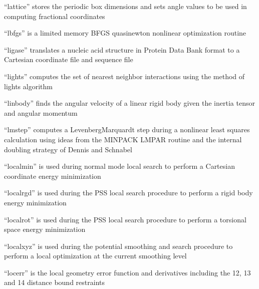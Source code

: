 \documentclass[letterpaper,11pt,english]{sphinxmanual}
\begin{document}
“lattice” stores the periodic box dimensions and sets angle
values to be used in computing fractional coordinates


“lbfgs” is a limited memory BFGS quasi\sphinxhyphen{}newton nonlinear
optimization routine


“ligase” translates a nucleic acid structure in Protein Data
Bank format to a Cartesian coordinate file and sequence file


“lights” computes the set of nearest neighbor interactions
using the method of lights algorithm


“linbody” finds the angular velocity of a linear rigid body
given the inertia tensor and angular momentum


“lmstep” computes a Levenberg\sphinxhyphen{}Marquardt step during a nonlinear
least squares calculation using ideas from the MINPACK LMPAR
routine and the internal doubling strategy of Dennis and Schnabel


“localmin” is used during normal mode local search to
perform a Cartesian coordinate energy minimization


“localrgd” is used during the PSS local search procedure
to perform a rigid body energy minimization


“localrot” is used during the PSS local search procedure
to perform a torsional space energy minimization


“localxyz” is used during the potential smoothing and search
procedure to perform a local optimization at the current
smoothing level


“locerr” is the local geometry error function and derivatives
including the 1\sphinxhyphen{}2, 1\sphinxhyphen{}3 and 1\sphinxhyphen{}4 distance bound restraints

\end{document}
